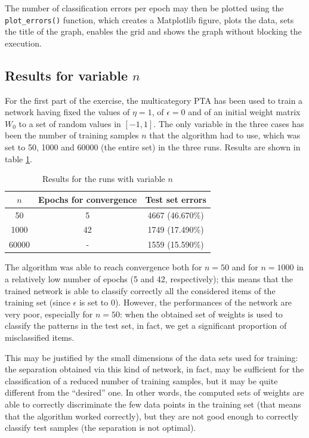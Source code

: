 \documentclass[letterpaper,headings=standardclasses]{scrartcl}
\begin{document}
The number of classification errors per epoch may then be plotted using the \texttt{plot\_errors()} function, which creates a Matplotlib figure, plots the data, sets the title of the graph, enables the grid and shows the graph without blocking the execution.

\subsection{Results for variable $n$}

For the first part of the exercise, the multicategory PTA has been used to train a network having fixed the values of $\eta = 1$, of $\epsilon = 0$ and of an initial weight matrix $W_0$ to a set of random values in $[-1, 1]$. The only variable in the three cases has been the number of training samples $n$ that the algorithm had to use, which was set to 50, 1000 and 60000 (the entire set) in the three runs. Results are shown in table \ref{results_varn}.

\begin{table}[h]
\centering
\begin{tabular}{|c|c|c|}
\hline
$n$   & Epochs for convergence & Test set errors \\ \hline
50    & 5  & 4667 (46.670\%) \\ \hline
1000  & 42 & 1749 (17.490\%) \\ \hline
60000 & -  & 1559 (15.590\%) \\ \hline
\end{tabular}
\caption{Results for the runs with variable $n$}
\label{results_varn}
\end{table}

The algorithm was able to reach convergence both for $n = 50$ and for $n = 1000$ in a relatively low number of epochs (5 and 42, respectively); this means that the trained network is able to classify correctly all the considered items of the training set (since $\epsilon$ is set to 0). However, the performances of the network are very poor, especially for $n = 50$: when the obtained set of weights is used to classify the patterns in the test set, in fact, we get a significant proportion of misclassified items.

This may be justified by the small dimensions of the data sets used for training: the separation obtained via this kind of network, in fact, may be sufficient for the classification of a reduced number of training samples, but it may be quite different from the “desired” one. In other words, the computed sets of weights are able to correctly discriminate the few data points in the training set (that means that the algorithm worked correctly), but they are not good enough to correctly classify test samples (the separation is not optimal).
\end{document}
